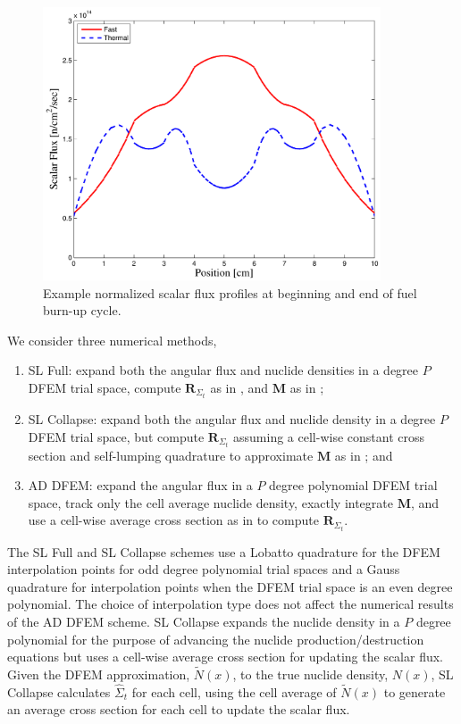 \begin{figure}[!hbp]
\centering
\includegraphics[width=10cm]{chapter5_depletion/P1_Lobatto_full_80_cells_t_steps60_End_600_Power_2000__EOC_Flux.pdf}
\caption{Example normalized scalar flux profiles at beginning and end of fuel burn-up cycle.}
\label{fig:ex_eoc_cycle}
\end{figure}
We consider three numerical methods,
\begin{enumerate}
\item SL Full: expand both the angular flux and nuclide densities in a degree $P$ DFEM trial space, compute $\mathbf{R}_{\Sigma_t}$ as in , and $\mathbf{M}$ as in ;
\item SL Collapse: expand both the angular flux and nuclide density in a degree $P$ DFEM trial space, but compute $\mathbf{R}_{\Sigma_t}$ assuming a cell-wise constant cross section and self-lumping quadrature to approximate $\mathbf{M}$ as in ; and
\item AD DFEM: expand the angular flux in a $P$ degree polynomial DFEM trial space, track only the cell average nuclide density, exactly integrate $\mathbf{M}$, and use a cell-wise average cross section as in  to compute $\mathbf{R}_{\Sigma_t}$.
\end{enumerate}
The SL Full and SL Collapse schemes use a Lobatto quadrature for the DFEM interpolation points for odd degree polynomial trial spaces and a Gauss quadrature for  interpolation points when the DFEM trial space is an even degree polynomial.
The choice of interpolation type does not affect the numerical results of the AD DFEM scheme.
SL Collapse expands the nuclide density in a $P$ degree polynomial for the purpose of advancing the nuclide production/destruction equations but uses a cell-wise average cross section for updating the scalar flux.  
Given the DFEM approximation, $\widetilde{N}(x)$, to the true nuclide density, $N(x)$, SL Collapse calculates $\hat{\Sigma}_t$ for each cell, using the cell average of $\widetilde{N}(x)$ to generate an average cross section for each cell to update the scalar flux.

